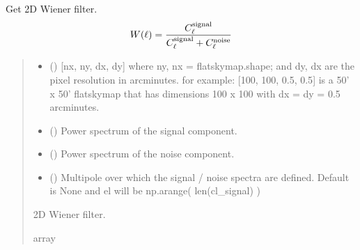 \documentclass[letterpaper,10pt,english]{sphinxmanual}
\begin{document}
\begin{fulllineitems}
\label{\detokenize{flatsky:flatsky.wiener_filter}}
\pysigstartsignatures
{}
\pysigstopsignatures
\sphinxAtStartPar
Get 2D Wiener filter.
\begin{equation*}
\begin{split}W(\ell) = \frac{ C_{\ell}^{\rm signal} } {C_{\ell}^{\rm signal} + C_{\ell}^{\rm noise}}\end{split}
\end{equation*}\begin{quote}\begin{description}
\begin{itemize}
\item {} 
\sphinxAtStartPar
{} () \textendash{} {[}nx, ny, dx, dy{]} where ny, nx = flatskymap.shape; and dy, dx are the pixel resolution in arcminutes.
for example: {[}100, 100, 0.5, 0.5{]} is a 50’ x 50’ flatskymap that has dimensions 100 x 100 with dx = dy = 0.5 arcminutes.

\item {} 
\sphinxAtStartPar
{} () \textendash{} Power spectrum of the signal component.

\item {} 
\sphinxAtStartPar
{} () \textendash{} Power spectrum of the noise component.

\item {} 
\sphinxAtStartPar
{} (\sphinxstyleliteralemphasis{\sphinxupquote{ (}}\sphinxstyleliteralemphasis{\sphinxupquote{)}}) \textendash{} Multipole over which the signal / noise spectra are defined.
Default is None and el will be np.arange( len(cl\_signal) )

\end{itemize}

\sphinxAtStartPar
{} \textendash{} 2D Wiener filter.

\sphinxAtStartPar
array

\end{description}\end{quote}

\end{fulllineitems}
\end{document}
